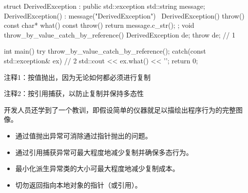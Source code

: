 
\begin{cpp}
struct DerivedException : public std::exception {
  std::string message;
  DerivedException() : message("DerivedException") {}
  ~DerivedException() throw() {}
  const char* what() const throw() { return message.c_str(); }
};
void throw_by_value_catch_by_reference() {
  DerivedException de;
  throw de; // 1
}

int main() {
  try {
    throw_by_value_catch_by_reference();
  } catch(const std::exception& ex) { // 2
    std::cout << ex.what() << '\n';
  }
  return 0;
}
\end{cpp}

{\footnotesize
注释1：按值抛出，因为无论如何都必须进行复制

注释2：按引用捕获，以防止复制并保持多态性
}

开发人员还学到了一个教训，即假设简单的仪器就足以描绘出程序行为的完整图像。


\begin{itemize}
\item
通过值抛出异常可消除通过指针抛出的问题。

\item
通过引用捕获异常可最大程度地减少复制并确保多态行为。

\item
最小化派生异常类的大小可最大程度地减少复制成本。

\item
切勿返回指向本地对象的指针（或引用）。
\end{itemize}
